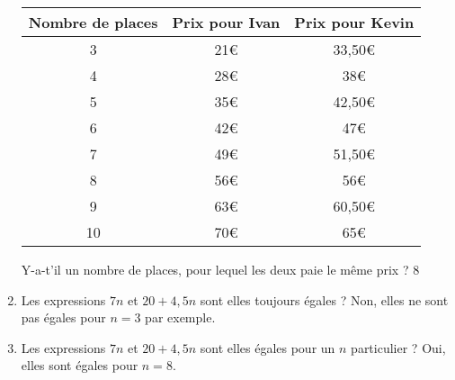 \documentclass[a4paper,12pt]{article}
\newcommand{\correction}[1]{{\color{red}#1}}
\begin{document}
\begin{enumerate}
	      \begin{center}
		      \renewcommand{\arraystretch}{1.5}
		      \begin{tabular}{|c|c|c|}
			      \hline
			      Nombre de places & Prix pour Ivan   & Prix pour Kevin
			      \\ \hline
			      3                & \correction{21€} & \correction{33,50€}
			      \\ \hline
			      4                & \correction{28€} & \correction{38€}
			      \\ \hline
			      5                & \correction{35€} & \correction{42,50€}
			      \\ \hline
			      6                & \correction{42€} & \correction{47€}
			      \\ \hline
			      7                & \correction{49€} & \correction{51,50€}
			      \\ \hline
			      8                & \correction{56€} & \correction{56€}
			      \\ \hline
			      9                & \correction{63€} & \correction{60,50€}
			      \\ \hline
			      10               & \correction{70€} & \correction{65€}
			      \\ \hline
		      \end{tabular}
	      \end{center}

	      Y-a-t'il un nombre de places, pour lequel les deux paie le même prix ? \correction{8}
	\item Les expressions $7n$ et $20 + 4{,}5n$ sont elles toujours égales ? \correction{Non, elles ne sont pas égales pour $n = 3$ par exemple.}
	\item Les expressions $7n$ et $20 + 4{,}5n$ sont elles égales pour un $n$ particulier ? \correction{Oui, elles sont égales pour $n = 8$.}
\end{enumerate}
\end{document}
